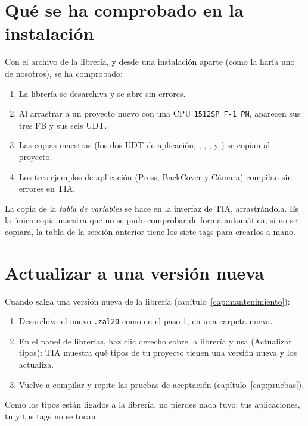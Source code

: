 \section{Qué se ha comprobado en la instalación}
Con el archivo de la librería, y desde una instalación aparte (como la haría uno de nosotros), se ha comprobado:
\begin{enumerate}
\item La librería se desarchiva y se abre sin errores.
\item Al arrastrar  a un proyecto nuevo con una CPU \texttt{1512SP F-1 PN}, aparecen sus tres FB y sus seis UDT.
\item Las copias maestras (los dos UDT de aplicación, , , ,  y ) se copian al proyecto.
\item Los tres ejemplos de aplicación (Press, BackCover y Cámara) compilan sin errores en TIA.
\end{enumerate}
La copia de la \emph{tabla de variables} se hace en la interfaz de TIA, arrastrándola. Es la única copia maestra que no se pudo comprobar de forma automática; si no se copiara, la tabla de la sección anterior tiene los siete tags para crearlos a mano.

\section{Actualizar a una versión nueva}
Cuando salga una versión nueva de la librería (capítulo~\ref{cap:mantenimiento}):
\begin{enumerate}
\item Desarchiva el nuevo \texttt{.zal20} como en el paso 1, en una carpeta nueva.
\item En el panel de librerías, haz clic derecho sobre la librería y usa  (Actualizar tipos): TIA muestra qué tipos de tu proyecto tienen una versión nueva y los actualiza.
\item Vuelve a compilar y repite las pruebas de aceptación (capítulo~\ref{cap:pruebas}).
\end{enumerate}
Como los tipos están ligados a la librería, no pierdes nada tuyo: tus aplicaciones, tu  y tus tags no se tocan.
